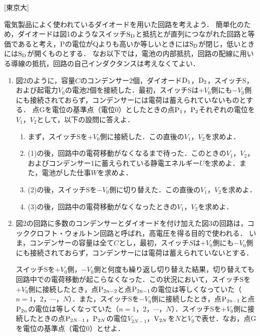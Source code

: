



\noindent{} [東京大]

電気製品によく使われているダイオードを用いた回路を考えよう．
簡単化のため，ダイオードは図1のようなスイッチ$\mathrm{S}_\mathrm{D}$と抵抗とが直列につながれた回路と等価であると考え，Pの電位がQよりも高いか等しいときには$\mathrm{S}_\mathrm{D}$が閉じ，低いときには$\mathrm{S}_\mathrm{D}$が開くものとする．
なお以下では，電池の内部抵抗，回路の配線に用いる導線の抵抗，回路の自己インダクタンスは考えなくてよい．

\begin{enumerate}[label=\Roman*]
  \setlength{\parindent}{1\zw}
  \setlength{\labelsep}{2\zw}
  \setlength{\itemindent}{1\zw}
  \item 図2のように，容量$C$のコンデンサー2個，ダイオード$\mathrm{D}_1$，$\mathrm{D}_2$，スイッチS，および起電力$V_0$の電池2個を接続した．最初，スイッチSは$+V_0$側にも$-V_0$側にも接続されておらず，コンデンサーには電荷は蓄えられていないものとする．
    点Gを電位の基準点（電位0）としたときの点$\mathrm{P}_1$，$\mathrm{P}_2$それぞれの電位を$V_1$，$V_2$として，以下の設問に答えよ．
    \begin{enumerate}[(1)]
    \setlength{\labelsep}{1\zw}
      \item まず，スイッチSを$+V_0$側に接続した．この直後の$V_1$，$V_2$を求めよ．
      \item (1)の後，回路中の電荷移動がなくなるまで待った．このときの$V_1$，$V_2$，およびコンデンサー1に蓄えられている静電エネルギー$U$を求めよ．また，電池がした仕事$W$を求めよ．
      \item (2)の後，スイッチSを$-V_0$側に切り替えた．この直後の$V_1$，$V_2$を求めよ．
      \item (3)の後，回路中の電荷移動がなくなったときの$V_1$，$V_2$を求めよ．
    \end{enumerate}
  \item 図2の回路に多数のコンデンサーとダイオードを付け加えた図3の回路は，コッククロフト・ウォルトン回路と呼ばれ，高電圧を得る目的で使われる．
    いま，コンデンサーの容量は全て$C$とし，最初，スイッチ$S$は$+V_0$側にも$-V_0$側にも接続されておらず，コンデンサーには電荷は蓄えられていないとする．

    スイッチSを$+V_0$側，$-V_0$側と何度も繰り返し切り替えた結果，切り替えても回路中での電荷移動が起こらなくなった．この状況において，スイッチSを$+V_0$側に接続したとき，点$\mathrm{P}_{2n-2}$と点$\mathrm{P}_{2n-1}$の電位は等しくなっていた（$n = 1$，$2$，$\cdots$，$N$）．また，スイッチSを$-V_0$側に接続したとき，点$\mathrm{P}_{2n-1}$と点$\mathrm{P}_{2n}$の電位は等しくなっていた（$n = 1$，$2$，$\cdots$，$N$）．スイッチSを$+V_0$側に接続したときの点$\mathrm{P}_{2N-1}$，$\mathrm{P}_{2N}$の電位$V_{2N-1}$，$\mathrm{V}_{2N}$を$N$と$V_0$で表せ．なお，点Gを電位の基準点（電位0）とせよ．
\end{enumerate}
